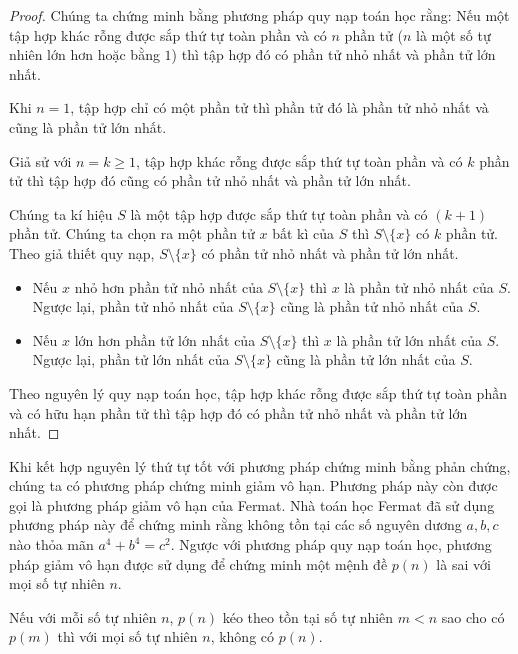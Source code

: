 \begin{proof}
    Chúng ta chứng minh bằng phương pháp quy nạp toán học rằng: Nếu một tập hợp khác rỗng được sắp thứ tự toàn phần và có $n$ phần tử ($n$ là một số tự nhiên lớn hơn hoặc bằng $1$) thì tập hợp đó có phần tử nhỏ nhất và phần tử lớn nhất.

    Khi $n = 1$, tập hợp chỉ có một phần tử thì phần tử đó là phần tử nhỏ nhất và cũng là phần tử lớn nhất.

    Giả sử với $n = k\geq 1$, tập hợp khác rỗng được sắp thứ tự toàn phần và có $k$ phần tử thì tập hợp đó cũng có phần tử nhỏ nhất và phần tử lớn nhất.

    Chúng ta kí hiệu $S$ là một tập hợp được sắp thứ tự toàn phần và có $(k+1)$ phần tử. Chúng ta chọn ra một phần tử $x$ bất kì của $S$ thì $S \setminus \{x\}$ có $k$ phần tử. Theo giả thiết quy nạp, $S \setminus \{x\}$ có phần tử nhỏ nhất và phần tử lớn nhất.
    \begin{itemize}
        \item Nếu $x$ nhỏ hơn phần tử nhỏ nhất của $S \setminus \{x\}$ thì $x$ là phần tử nhỏ nhất của $S$. Ngược lại, phần tử nhỏ nhất của $S \setminus \{x\}$ cũng là phần tử nhỏ nhất của $S$.
        \item Nếu $x$ lớn hơn phần tử lớn nhất của $S \setminus\{x\}$ thì $x$ là phần tử lớn nhất của $S$. Ngược lại, phần tử lớn nhất của $S \setminus \{x\}$ cũng là phần tử lớn nhất của $S$.
    \end{itemize}

    Theo nguyên lý quy nạp toán học, tập hợp khác rỗng được sắp thứ tự toàn phần và có hữu hạn phần tử thì tập hợp đó có phần tử nhỏ nhất và phần tử lớn nhất.
\end{proof}

Khi kết hợp nguyên lý thứ tự tốt với phương pháp chứng minh bằng phản chứng, chúng ta có phương pháp chứng minh giảm vô hạn. Phương pháp này còn được gọi là phương pháp giảm vô hạn của Fermat. Nhà toán học Fermat đã sử dụng phương pháp này để chứng minh rằng không tồn tại các số nguyên dương $a, b, c$ nào thỏa mãn $a^{4} + b^{4} = c^{2}$. Ngược với phương pháp quy nạp toán học, phương pháp giảm vô hạn được sử dụng để chứng minh một mệnh đề $p(n)$ là sai với mọi số tự nhiên $n$.

\begin{theorem}
    Nếu với mỗi số tự nhiên $n$, $p(n)$ kéo theo tồn tại số tự nhiên $m < n$ sao cho có $p(m)$ thì với mọi số tự nhiên $n$, không có $p(n)$.
\end{theorem}

